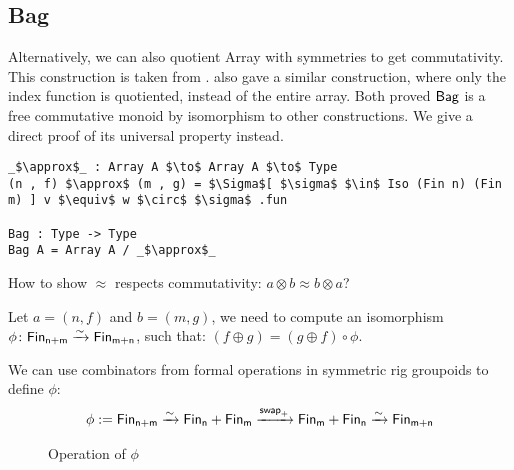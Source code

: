 \subsection{Bag}\label{cmon:bag}
Alternatively, we can also quotient Array with symmetries to get commutativity.
This construction is taken from \cite{Choudhury_2023}. \cite{joram_et_al:LIPIcs.ITP.2023.20}
also gave a similar construction, where only the index function is quotiented, instead of
the entire array. Both proved $\operatorname{\mathsf{Bag}}$ is a free commutative monoid by isomorphism to
other constructions. We give a direct proof of its universal property instead.

\begin{lstlisting}
_$\approx$_ : Array A $\to$ Array A $\to$ Type
(n , f) $\approx$ (m , g) = $\Sigma$[ $\sigma$ $\in$ Iso (Fin n) (Fin m) ] v $\equiv$ w $\circ$ $\sigma$ .fun

Bag : Type -> Type
Bag A = Array A / _$\approx$_
\end{lstlisting}

How to show $\approx$ respects commutativity: $a \otimes b \approx b \otimes a$?

Let $a = (n , f)$ and $b = (m , g)$, we need to compute an isomorphism $\phi\colon \Fin[n+m]\xto{\sim}\Fin[m+n]$,
such that: $(f \oplus g) = (g \oplus f) \circ \phi$.

We can use combinators from formal operations in symmetric rig groupoids \cite{10.1145/3498667} to define $\phi$:
\begin{align*}
    \phi := \Fin[n+m] \xto{\sim} \Fin[n] + \Fin[m] \xto{\term{swap}_{+}} \Fin[m] + \Fin[n] \xto{\sim} \Fin[m+n] \\
\end{align*}

\begin{figure}[H]
    \centering
    \vspace{-1em}
    \caption{Operation of $\phi$}
    \label{fig:enter-label}
\end{figure}

